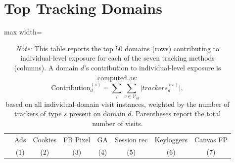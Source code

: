 \documentclass[12pt, letterpaper]{article}
\begin{document}
\section{Top Tracking Domains}
\label{sm:top_tracking_domains}
% 
\begin{table}[ht]
\centering
\setlength\tabcolsep{2 pt}
\setlength{\defaultaddspace}{0pt}
\def\sym#1{\ifmmode^{#1}\else\(^{#1}\)\fi}
\caption{Top domains contributing to exposure}
\label{tab:bl_top_contributors_domain}
\begingroup
\centering
\begin{adjustbox}{max width=\textwidth}
\begin{tabular}{@{\hspace{0\tabcolsep}}llllllll@{\hspace{0\tabcolsep}}}
      \toprule
      &\multicolumn{1}{c}{Ads}&\multicolumn{1}{c}{Cookies}&\multicolumn{1}{c}{FB Pixel}&\multicolumn{1}{c}{GA}&\multicolumn{1}{c}{Session rec}&\multicolumn{1}{c}{Keyloggers}&\multicolumn{1}{c}{Canvas FP}\\
      &\multicolumn{1}{c}{(1)}&\multicolumn{1}{c}{(2)}&\multicolumn{1}{c}{(3)}&\multicolumn{1}{c}{(4)}&\multicolumn{1}{c}{(5)}&\multicolumn{1}{c}{(6)}&\multicolumn{1}{c}{(7)}\\
      \midrule
      
      \bottomrule
   \end{tabular}
\end{adjustbox}
\par\endgroup
\caption*{
    \footnotesize \textit{Note:}
    This table reports the top 50 domains (rows) contributing to individual-level exposure for each of the seven tracking methods (columns).
    A domain $d$'s contribution to individual-level exposure is computed as:
    \begin{equation*}
    \text{Contribution}_d^{(s)} = 
    \sum_{i} \sum_{v \in \mathcal{V}_{id}} 
    \vert trackers^{(s)}_d \vert,
    \end{equation*}
    based on all individual-domain visit instances, weighted by the number of trackers of type $s$ present on domain $d$.
    Parentheses report the total number of visits.
}
\end{table}


\end{document}
